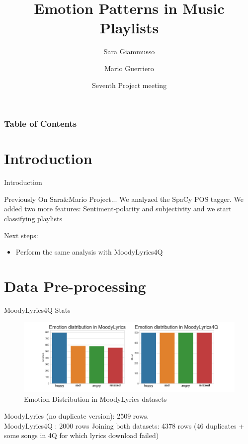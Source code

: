 \documentclass[xcolor=dvipsnames]{beamer}
\title[Emotion Patterns in Music Playlists] %
{Emotion Patterns in Music Playlists}
\author[Sara, Mario] %
{Sara Giammusso\inst{1}\inst{2} \and Mario Guerriero \inst{1}\inst{2}}
\institute[EURECOM] %
{
 \inst{1}
 MSc student in Data Science Department, EURECOM, T\'el\'ecom ParisTech, France\\
  \inst{2}%
 MSc student in Department of Control and Computer Engineering, Politecnico di Torino, Italy
}
\date[2018 May 18] %
{Seventh Project meeting}
\begin{document}
\frame{\titlepage}

\begin{frame}
\frametitle{Table of Contents}
\tableofcontents
\end{frame}

\section{Introduction}
\begin{frame}{Introduction}
\begin{block}{Previously On Sara\&Mario Project...}
We analyzed the SpaCy POS tagger. We added two more features: Sentiment-polarity and subjectivity and we start classifying playlists
\end{block}
Next steps:
\begin{itemize}
\item Perform the same analysis with MoodyLyrics4Q
\end{itemize}
\end{frame}

\section{Data Pre-processing}

\begin{frame}{MoodyLyrics4Q Stats}
\begin{figure}
  \includegraphics[width=\linewidth]{./images/Stats.png}
  \caption{Emotion Distribution in MoodyLyrics datasets}
\end{figure}
MoodyLyrics (no duplicate version): 2509 rows.\\
MoodyLyrics4Q                               : 2000 rows
Joining both datasets:                       4378 rows (46 duplicates + some songs in 4Q for which lyrics download failed)
\end{frame}
\end{document}
